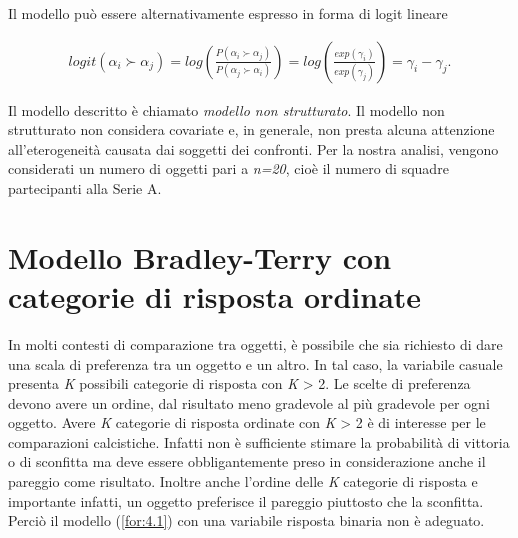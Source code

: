 Il modello può essere alternativamente espresso in forma di logit lineare

\begin{align}
		logit(\alpha_{i} \succ \alpha_{j}) =  log\left( \frac{P( \alpha_{i} \succ \alpha_{j})}{P( \alpha_{j} \succ \alpha_{i})} \right) = log\left(\frac{exp(\gamma_{i})}{exp(\gamma_{j})}\right) = \gamma_i - \gamma_j \label{for:4.1}.
\end{align}

Il modello descritto è chiamato \emph{modello non strutturato}. Il modello non strutturato non considera covariate e, in generale, non presta alcuna attenzione all'eterogeneità causata dai soggetti dei confronti.
Per la nostra analisi, vengono considerati un numero di oggetti pari a \emph{n=20}, cioè il numero di squadre partecipanti alla Serie A.


\section{Modello Bradley-Terry con categorie di risposta ordinate}\label{sez:4.2}
In molti contesti di comparazione tra oggetti, è possibile che sia richiesto di dare una scala di preferenza tra un oggetto e un altro. In tal caso, la variabile casuale presenta \emph{K} possibili categorie di risposta con \emph{K} > 2. Le scelte di preferenza devono avere un ordine, dal risultato meno gradevole al più gradevole per ogni oggetto. Avere \emph{K} categorie di risposta ordinate con \emph{K} > 2 è di interesse per le comparazioni calcistiche. Infatti non è sufficiente stimare la probabilità di vittoria o di sconfitta ma deve essere obbligantemente preso in considerazione anche il pareggio come risultato. Inoltre anche l'ordine delle \emph{K} categorie di risposta e importante infatti, un oggetto preferisce il pareggio piuttosto che la sconfitta. Perciò il modello (\ref{for:4.1}) con una variabile risposta binaria non è adeguato. 



